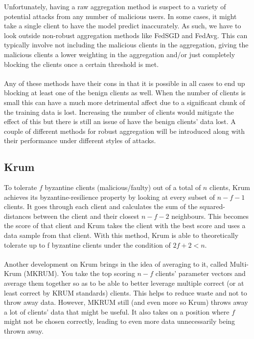 Unfortunately, having a raw aggregation method is suspect to a variety of potential attacks from any number of malicious users. 
In some cases, it might take a single client to have the model predict inaccurately. 
As such, we have to look outside non-robust aggregation methods like FedSGD and FedAvg. 
This can typically involve not including the malicious clients in the aggregation, giving the malicious clients a lower weighting in the aggregation and/or just completely blocking the clients once a certain threshold is met. 
\\ \\
Any of these methods have their cons in that it is possible in all cases to end up blocking at least one of the benign clients as well. 
When the number of clients is small this can have a much more detrimental affect due to a significant chunk of the training data is lost. 
Increasing the number of clients would mitigate the effect of this but there is still an issue of have the benign clients' data lost. 
A couple of different methods for robust aggregation will be introduced along with their performance under different styles of attacks.

\subsection{Krum}
To tolerate $f$ byzantine clients (malicious/faulty) out of a total of $n$ clients, Krum \cite{krum} achieves its byzantine-resilience property by looking at every subset of $n-f-1$ clients. 
It goes through each client and calculates the sum of the squared-distances between the client and their closest $n-f-2$ neighbours.
This becomes the score of that client and Krum takes the client with the best score and uses a data sample from that client.
With this method, Krum is able to theoretically tolerate up to f byzantine clients under the condition of $2f + 2 < n$. 
\\ \\
Another development on Krum brings in the idea of averaging to it, called Multi-Krum (MKRUM).
You take the top scoring $n-f$ clients' parameter vectors and average them together so as to be able to better leverage multiple correct (or at least correct by KRUM standards) clients.
This helps to reduce waste and not to throw away data. However, MKRUM still (and even more so Krum) throws away a lot of clients' data that might be useful. It also takes on a position where $f$ might not be chosen correctly, leading to even more data unnecessarily being thrown away.

